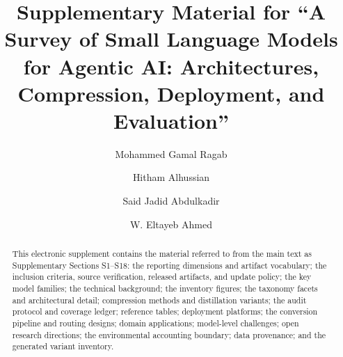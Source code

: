 \documentclass[acmsmall,screen,review]{acmart}
\begin{document}
\title[A Survey of Small Language Models for Agentic AI: Supplement]{Supplementary Material for
  ``A Survey of Small Language Models for Agentic AI: Architectures, Compression,
  Deployment, and Evaluation''}

\author{Mohammed Gamal Ragab}

\author{Hitham Alhussian}
\authornotemark[1]

\author{Said Jadid Abdulkadir}

\author{W. Eltayeb Ahmed}

\renewcommand{\shortauthors}{Ragab et al.}

\begin{abstract}
  This electronic supplement contains the material referred to from the main
  text as Supplementary Sections S1--S18: the reporting dimensions and artifact
  vocabulary; the inclusion criteria, source verification, released artifacts,
  and update policy; the key model families; the technical background; the
  inventory figures; the taxonomy facets and architectural detail; compression
  methods and distillation variants; the audit protocol and coverage ledger;
  reference tables; deployment platforms; the conversion pipeline and routing
  designs; domain applications; model-level challenges; open research
  directions; the environmental accounting boundary; data provenance; and the
  generated variant inventory.
\end{abstract}
\end{document}
